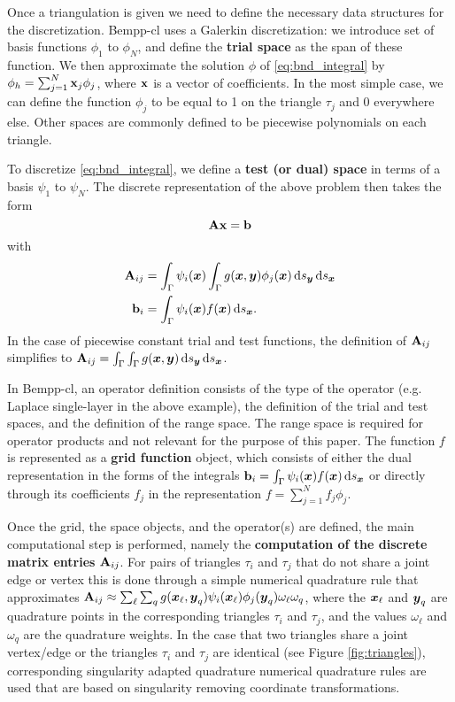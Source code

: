 Once a triangulation is given we need to define the necessary data structures for the discretization. Bempp-cl uses a Galerkin discretization: we introduce set of basis functions \(\phi_1\) to \(\phi_N\), and define the \textbf{trial space} as the span of these function. We then approximate the solution \(\phi\) of \cref{eq:bnd_integral} by $\phi_h=\sum_{j=1}^N \mathbf{x}_j\phi_j$, where $\mathbf{x}$ is a vector of coefficients. In the most simple case, we can define the function \(\phi_j\) to be equal to 1 on the triangle $\tau_j$ and 0 everywhere else. Other spaces are commonly defined to be piecewise polynomials on each triangle.

To discretize \cref{eq:bnd_integral}, we define a \textbf{test (or dual) space} in terms of a basis \(\psi_1\) to \(\psi_N\). The discrete representation of the above problem then takes the form
$$
\mathbf{A}\mathbf{x} = \mathbf{b}
$$
with
\begin{align*}
\dmat{A}_{ij} &= \int_{\Gamma}\psi_i(\bx)\int_{\Gamma}g(\bx, \by)\phi_j(\bx)\ds[\by]\ds[\bx]\\
\dvec{b}_i &= \int_{\Gamma}\psi_i(\bx)f(\bx)\ds[\bx].
\end{align*}
In the case of piecewise constant trial and test functions, the definition of $\mathbf{A}_{ij}$ simplifies to $\dmat{A}_{ij} = \int_{\Gamma}\int_{\Gamma}g(\bx, \by)\ds[\by]\ds[\bx]$.

In Bempp-cl, an operator definition consists of the type of the operator (e.g. Laplace single-layer in the above example),
the definition of the trial and test spaces, and the definition of the range space. The range space is required for operator
products and not relevant for the purpose of this paper. The function $f$ is represented as a \textbf{grid function} object, which
consists of either the dual representation in the forms of the integrals $\dvec{b}_i = \int_{\Gamma}\psi_i(\bx)f(\bx)\ds[\bx]$ or directly through its coefficients $f_j$ in the representation $f=\sum_{j=1}^N f_j\phi_j$.

Once the grid, the space objects, and the operator(s) are defined, the main computational step is performed, namely the \textbf{computation of the discrete matrix entries} $\mathbf{A}_{ij}$. For pairs of triangles $\tau_i$ and $\tau_j$ that do not share a joint edge or vertex this is done through a simple numerical quadrature rule that approximates $\mathbf{A}_{ij}\approx \sum_{\ell}\sum_{q} g(\boldsymbol{x}_\ell, \boldsymbol{y}_q)\psi_i(\boldsymbol{x}_\ell)\phi_j(\boldsymbol{y}_q)\omega_\ell\omega_q$, where the $\boldsymbol{x}_\ell$ and $\boldsymbol{y}_q$ are quadrature points in the corresponding triangles $\tau_i$ and $\tau_j$, and the values $\omega_\ell$ and $\omega_q$ are the quadrature weights. In the case that two triangles share a joint vertex/edge or the triangles $\tau_i$ and $\tau_j$ are identical (see Figure \ref{fig:triangles}), corresponding singularity adapted quadrature numerical quadrature rules are used that are based on singularity removing coordinate transformations.

